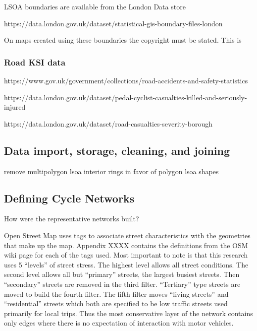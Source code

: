 \documentclass[11pt]{article} %
\begin{document}
LSOA boundaries are available from the London Data store

https://data.london.gov.uk/dataset/statistical-gis-boundary-files-london

On maps created using these boundaries the copyright must be stated. This is

\subsubsection{Road KSI data}

https://www.gov.uk/government/collections/road-accidents-and-safety-statistics

https://data.london.gov.uk/dataset/pedal-cyclist-casualties-killed-and-seriously-injured

https://data.london.gov.uk/dataset/road-casualties-severity-borough

\subsection{Data import, storage, cleaning, and joining}

remove multipolygon lsoa interior rings in favor of polygon lsoa shapes

\subsection{Defining Cycle Networks}

How were the representative networks built? 

Open Street Map uses tags to associate street characteristics with the geometries that make up the map. Appendix XXXX contains the definitions from the OSM wiki page for each of the tags used. Most important to note is that this research uses 5 ``levels'' of street stress. The highest level allows all street conditions. The second level allows all but ``primary'' streets, the largest busiest streets. Then ``secondary'' streets are removed in the third filter. ``Tertiary'' type streets are moved to build the fourth filter. The fifth filter moves ``living streets'' and ``residential'' streets which both are specified to be low traffic streets used primarily for local trips. Thus the most conservative layer of the network contains only edges where there is no expectation of interaction with motor vehicles. 
\end{document}
